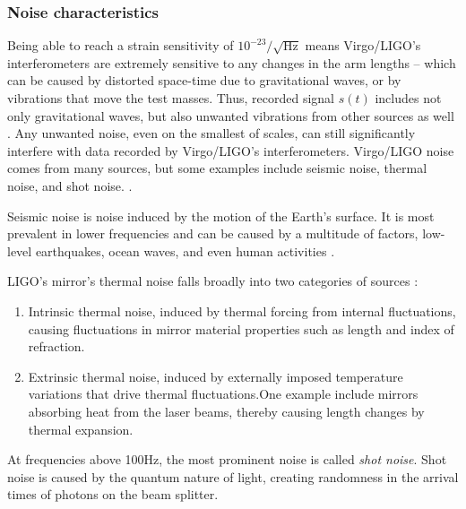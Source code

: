 \documentclass[preprint,
letterpaper,
 amsmath,amssymb,
 aps,
]{revtex4-2}
\begin{document}
\subsubsection{Noise characteristics}
Being able to reach a strain sensitivity of $10^{-23}/\sqrt{\text{Hz}}$ \cite{sensitivity} means Virgo/LIGO's interferometers are extremely sensitive to any changes in the arm lengths – which can be caused by distorted space-time due to gravitational waves, or by vibrations that move the test masses. Thus, recorded signal $s(t)$ includes not only gravitational waves, but also unwanted vibrations from other sources as well \cite{ultimate}. Any unwanted noise, even on the smallest of scales, can still significantly interfere with data recorded by Virgo/LIGO's interferometers. Virgo/LIGO noise comes from many sources, but some examples include seismic noise, thermal noise, and shot noise.  \cite{blair_howell_ju_zhao_2012}.

Seismic noise is noise induced by the motion of the Earth's surface. It is  most prevalent in lower frequencies and can be caused by a multitude of factors, low-level earthquakes, ocean waves, and even human activities \cite{blair_howell_ju_zhao_2012}.

LIGO's mirror's thermal noise falls broadly into two categories of sources \cite{rao_libbrecht_2003}:
\begin{enumerate}[nolistsep]
\item Intrinsic thermal noise, induced by thermal forcing from internal fluctuations, causing fluctuations in mirror material properties such as length and index of refraction.
\item Extrinsic thermal noise, induced by externally imposed temperature variations that drive thermal fluctuations.One example include mirrors absorbing heat from the laser beams, thereby causing length changes by thermal expansion.
\end{enumerate}

At frequencies above 100Hz, the most prominent noise is called \textit{shot noise}. Shot noise is caused by the quantum nature of light, creating randomness in the arrival times of photons on the beam splitter.
\end{document}
